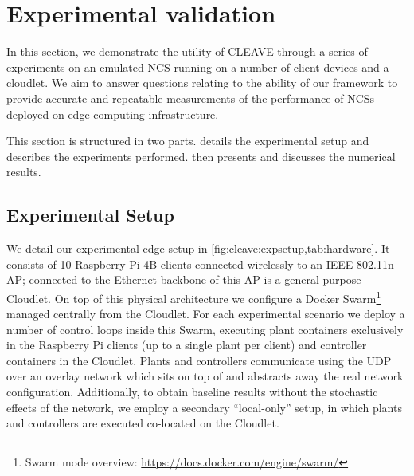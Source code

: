 \section{Experimental validation}\label{sec:experiments}

In this section, we demonstrate the utility of \ac{CLEAVE} through a series of experiments on an emulated \ac{NCS} running on a number of client devices and a cloudlet.
We aim to answer questions relating to the ability of our framework to provide accurate and repeatable measurements of the performance of \acp{NCS} deployed on edge computing infrastructure.

This section is structured in two parts.
 details the experimental setup and describes the experiments performed.
 then presents and discusses the numerical results.

\subsection{Experimental Setup}\label{ssec:expsetup}

We detail our experimental edge setup in \cref{fig:cleave:expsetup,tab:hardware}.
It consists of \num{10} Raspberry Pi 4B  clients connected wirelessly to an IEEE 802.11n \ac{AP}; connected to the Ethernet backbone of this \ac{AP} is a general-purpose Cloudlet.
On top of this physical architecture we configure a Docker Swarm\footnote{Swarm mode overview: \url{https://docs.docker.com/engine/swarm/}} managed centrally from the Cloudlet.
For each experimental scenario we deploy a number of control loops inside this Swarm, executing plant containers exclusively in the Raspberry Pi clients (up to a single plant per client) and controller containers in the Cloudlet.
Plants and controllers communicate using the \ac{UDP} over an overlay network which sits on top of and abstracts away the real network configuration.
Additionally, to obtain baseline results without the stochastic effects of the network, we employ a secondary ``local-only'' setup, in which plants and controllers are executed co-located on the Cloudlet.



